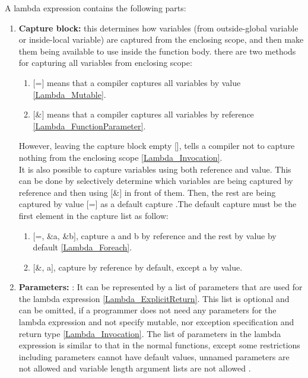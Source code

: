 \documentclass[11pt]{report}
\begin{document}
A lambda expression contains the following parts:
\begin{enumerate}
\item \textbf{Capture block:} this determines how variables (from outside-global variable or inside-local variable) are captured from the enclosing scope, and then make them being available to use inside the function body. there are two methods for capturing all variables from enclosing scope:

      \begin{enumerate}
      \item $[$=$]$ means that a compiler captures all variables by value \ref{Lambda_Mutable}.
      \item $[$\&$]$ means that a compiler captures all variables by reference 
             \ref{Lambda_FunctionParameter}.
      \end{enumerate}
      However, leaving the capture block empty [], tells a compiler not to capture nothing from the enclosing scope \ref{Lambda_Invocation}. \\
      It is also possible to capture variables using both reference and value. This can be done by selectively determine which variables are being captured by reference and then using $[$\&$]$ in front of them. Then, the rest are being captured by value $[$=$]$ as a default capture \cite{Gregorie:professionalcpp}.The default capture must be the first element in the capture list as follow:
      \begin{enumerate}
      \item $[$=, \&a, \&b$]$, capture a and b by reference and the rest by value by default \ref{Lambda_Foreach}.
      \item $[$\&, a$]$, capture by reference by default, except a by value.
      \end{enumerate}
      
      
\item \textbf{Parameters:} : It can be represented by a list of parameters that are used for the lambda expression \ref{Lambda_ExplicitReturn}. This list is optional and can be omitted, if a programmer does not need any parameters for the lambda expression and not specify mutable, nor exception specification and return type \ref{Lambda_Invocation}. The list of parameters in the lambda expression is similar to that in the normal functions, except some restrictions including parameters cannot have default values, unnamed parameters are not allowed and variable length argument lists are not allowed \cite{Cppreference:2012:Cpp11}.


\end{enumerate}
\end{document}
